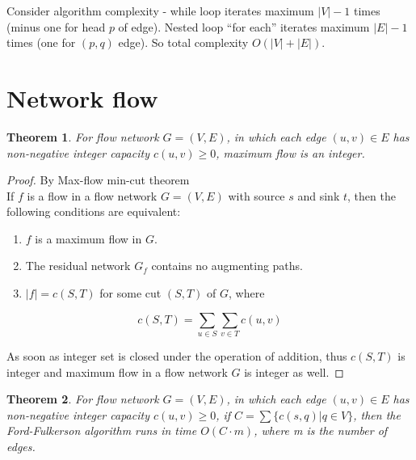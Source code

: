 \documentclass{article}
\newtheorem{theorem}{Theorem}[section]
\begin{document}
\vspace{1em}
Consider algorithm complexity - while loop iterates maximum $|V|-1$ times (minus one for head
$p$ of edge). Nested loop ``for each'' iterates maximum $|E|-1$ times (one for $(p,q)$ edge).
So total complexity $O(|V|+|E|)$.


\pagebreak
\section{Network flow}

\begin{theorem}
  For flow network $G = (V,E)$, in which each edge $(u,v) \in E$ has non-negative
  integer capacity $c(u,v) \geq 0$, maximum flow is an integer.
\end{theorem}

\begin{proof}
  By Max-flow min-cut theorem \cite[Theorem 26.6][page 723]{introtoalg}\\
  If $f$ is a flow in a flow network $G = (V,E)$ with source $s$ and sink $t$, then the
  following conditions are equivalent:

  \begin{enumerate}
    \item $f$ is a maximum flow in $G$.
    \item The residual network $G_f$ contains no augmenting paths.
    \item $|f| = c(S,T)$ for some cut $(S,T)$ of $G$, where
  \end{enumerate}
  $$c(S,T) = \sum_{u \in S} \sum_{v \in T} c(u,v)$$

  As soon as integer set is closed under the operation of addition, thus
  $c(S,T)$ is integer and maximum flow in a flow network $G$ is integer as well. 
\end{proof}

\begin{theorem}
  For flow network $G = (V,E)$, in which each edge $(u,v) \in E$ has non-negative
  integer capacity $c(u,v) \geq 0$, if $C=\sum\{c(s,q)|q \in V\}$,
  then the Ford-Fulkerson algorithm runs in time $O(C \cdot m)$, where m is the number of edges.
\end{theorem}
\end{document}
